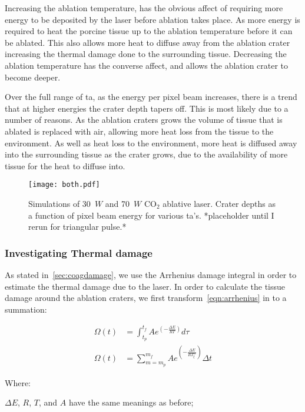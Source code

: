 Increasing the ablation temperature, has the obvious affect of requiring more energy to be deposited by the laser before ablation takes place. As more energy is required to heat the porcine tissue up to the ablation temperature before it can be ablated. This also allows more heat to diffuse away from the ablation crater increasing the thermal damage done to the surrounding tissue. Decreasing the ablation temperature has the converse affect, and allows the ablation crater to become deeper.

Over the full range of \gls{ta}, as the energy per pixel beam increases, there is a trend that at higher energies the crater depth tapers off. This is most likely due to a number of reasons. As the ablation craters grows the volume of tissue that is ablated is replaced with air, allowing more heat loss from the tissue to the environment. As well as heat loss to the environment, more heat is diffused away into the surrounding tissue as the crater grows, due to the availability of more tissue for the heat to diffuse into.


\begin{figure}
	\centering
    \texttt{[image: both.pdf]}
    \caption{Simulations of 30~$W$ and 70~$W$ CO$_2$ ablative laser. Crater depths as a function of pixel beam energy for various \gls{ta}'s. *placeholder until I rerun for triangular pulse.*}\label{fig:ta}
\end{figure}
 

\subsubsection{Investigating Thermal damage} 

As stated in~\cref{sec:coagdamage}, we use the Arrhenius damage integral in order to estimate the thermal damage due to the laser. In order to calculate the tissue damage around the ablation craters, we first transform~\cref{eqn:arrhenius} in to a summation:

\begin{align}
\Omega(t) &= \int^{t_{f}}_{t_p} Ae^{(-\tfrac{\Delta E}{RT})}d\tau \\
\Omega(t) &= \sum_{m=m_p}^{m_f} Ae^{(-\tfrac{\Delta E}{RT_{\xi}^{m}})}\Delta t\label{eqn:damagesum}
\end{align}
 
\noindent Where: 
	
	\indent $\Delta E$, $R$, $T$, and $A$ have the same meanings as before;
	

